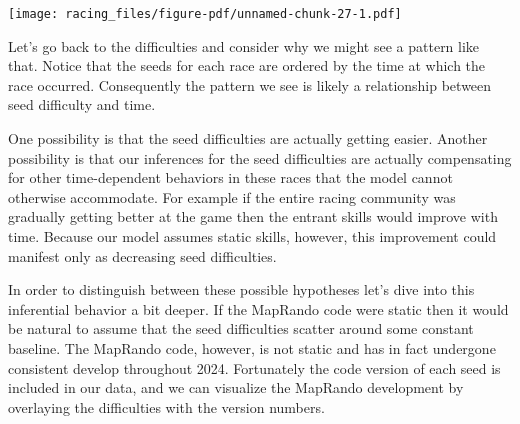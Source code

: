 \documentclass[
  letterpaper,
  DIV=11,
  numbers=noendperiod]{scrartcl}
\begin{document}
\texttt{[image: racing\_files/figure-pdf/unnamed-chunk-27-1.pdf]}

Let's go back to the difficulties and consider why we might see a
pattern like that. Notice that the seeds for each race are ordered by
the time at which the race occurred. Consequently the pattern we see is
likely a relationship between seed difficulty and time.

One possibility is that the seed difficulties are actually getting
easier. Another possibility is that our inferences for the seed
difficulties are actually compensating for other time-dependent
behaviors in these races that the model cannot otherwise accommodate.
For example if the entire racing community was gradually getting better
at the game then the entrant skills would improve with time. Because our
model assumes static skills, however, this improvement could manifest
only as decreasing seed difficulties.

In order to distinguish between these possible hypotheses let's dive
into this inferential behavior a bit deeper. If the MapRando code were
static then it would be natural to assume that the seed difficulties
scatter around some constant baseline. The MapRando code, however, is
not static and has in fact undergone consistent develop throughout 2024.
Fortunately the code version of each seed is included in our data, and
we can visualize the MapRando development by overlaying the difficulties
with the version numbers.
\end{document}
